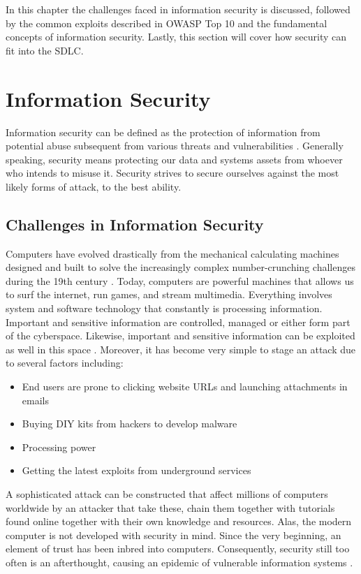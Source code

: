 In this chapter the challenges faced in information security is discussed, followed by the common exploits described in OWASP Top 10 and the fundamental concepts of information security. Lastly, this section will cover how security can fit into the SDLC.

\section{Information Security}
Information security can be defined as the protection of information from potential abuse subsequent from various threats and vulnerabilities \cite{von_Solms_2013}. Generally speaking, security means protecting our data and systems assets from whoever who intends to misuse it. Security strives to secure ourselves against the most likely forms of attack, to the best ability. 

\subsection{Challenges in Information Security}\label{sec:challenges-in-is}
Computers have evolved drastically from the mechanical calculating machines designed and built to solve the increasingly complex number-crunching challenges during the 19th century \cite{history_of_computers}. Today, computers are powerful machines that allows us to surf the internet, run games, and stream multimedia. Everything involves system and software technology that constantly is processing information. Important and sensitive information are controlled, managed or either form part of the cyberspace. Likewise, important and sensitive information can be exploited as well in this space \cite{Li_2021}. Moreover, it has become very simple to stage an attack due to several factors including:
\begin{itemize}
    \item End users are prone to clicking website URLs and launching attachments in emails
    \item Buying DIY kits from hackers to develop malware
    \item Processing power 
    \item Getting the latest exploits from underground services
\end{itemize}
A sophisticated attack can be constructed that affect millions of computers worldwide by an attacker that take these, chain them together with tutorials found online together with their own knowledge and resources. Alas, the modern computer is not developed with security in mind. Since the very beginning, an element of trust has been inbred into computers. Consequently, security still too often is an afterthought, causing an epidemic of vulnerable information systems \cite{death2017information}.

